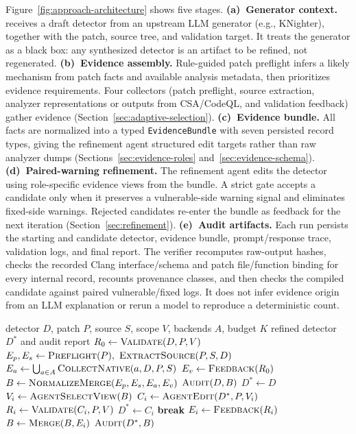 Figure~\ref{fig:approach-architecture} shows five stages.
\textbf{(a)~Generator context.}  \toolname receives a draft detector from an upstream LLM generator (e.g., KNighter), together with the patch, source tree, and validation target.  It treats the generator as a black box: any synthesized detector is an artifact to be refined, not regenerated.
\textbf{(b)~Evidence assembly.}  Rule-guided patch preflight infers a likely mechanism from patch facts and available analysis metadata, then prioritizes evidence requirements.  Four collectors (patch preflight, source extraction, analyzer representations or outputs from CSA/CodeQL, and validation feedback) gather evidence (Section~\ref{sec:adaptive-selection}).
\textbf{(c)~Evidence bundle.}  All facts are normalized into a typed \texttt{EvidenceBundle} with seven persisted record types, giving the refinement agent structured edit targets rather than raw analyzer dumps (Sections~\ref{sec:evidence-roles} and~\ref{sec:evidence-schema}).
\textbf{(d)~Paired-warning refinement.}  The refinement agent edits the detector using role-specific evidence views from the bundle.  A strict gate accepts a candidate only when it preserves a vulnerable-side warning signal and eliminates fixed-side warnings.  Rejected candidates re-enter the bundle as feedback for the next iteration (Section~\ref{sec:refinement}).
\textbf{(e)~Audit artifacts.}  Each run persists the starting and candidate detector, evidence bundle, prompt/response trace, validation logs, and final report.  The verifier recomputes raw-output hashes, checks the recorded Clang interface/schema and patch file/function binding for every internal record, recounts provenance classes, and then checks the compiled candidate against paired vulnerable/fixed logs.  It does not infer evidence origin from an LLM explanation or rerun a model to reproduce a deterministic count.

\begin{algorithm}[t]
\footnotesize
\caption{Paired-Warning Evidence-Guided Refinement}
\label{alg:evidence-guided-refinement}
\begin{algorithmic}[1]
\Require detector $D$, patch $P$, source $S$, scope $V$, backends $A$, budget $K$
\Ensure refined detector $D^*$ and audit report
\State $R_0 \gets \Call{Validate}{D,P,V}$
\State $E_p,E_s \gets \Call{Preflight}{P},\ \Call{ExtractSource}{P,S,D}$
\State $E_a \gets \bigcup_{a\in A}\Call{CollectNative}{a,D,P,S}$ \quad $E_v \gets \Call{Feedback}{R_0}$
\State $B \gets \Call{NormalizeMerge}{E_p,E_s,E_a,E_v}$
  \State \Return $\Call{Audit}{D,B}$
\EndIf
\State $D^* \gets D$
  \State $V_i \gets \Call{AgentSelectView}{B}$ \quad $C_i \gets \Call{AgentEdit}{D^*,P,V_i}$
  \State $R_i \gets \Call{Validate}{C_i,P,V}$
    \State $D^* \gets C_i$ \quad \textbf{break}
  \Else
    \State $E_i \gets \Call{Feedback}{R_i}$ \quad $B \gets \Call{Merge}{B,E_i}$
  \EndIf
\EndFor
\State \Return $\Call{Audit}{D^*,B}$
\end{algorithmic}
\end{algorithm}

